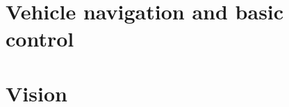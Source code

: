 \documentclass[10pt]{article}
\begin{document}
\maketitle

\tableofcontents

\section{Vehicle navigation and basic control}








\section{Vision}








\end{document}
